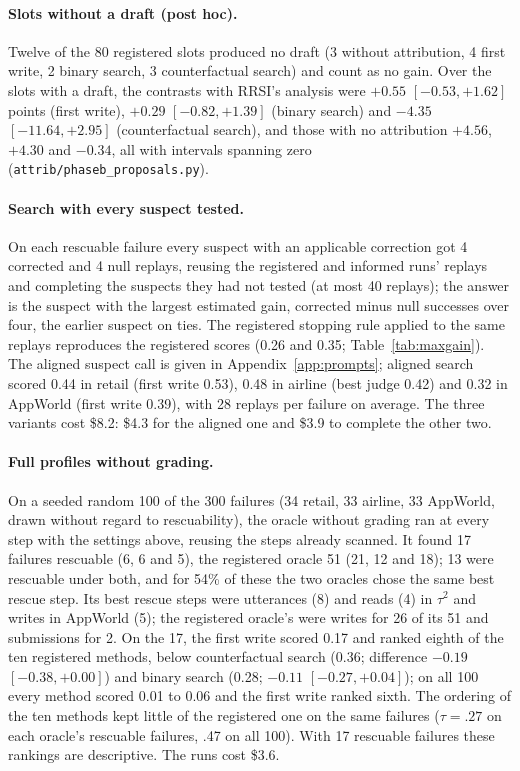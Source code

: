 \documentclass[11pt]{article}
\begin{document}
\paragraph{Slots without a draft (post hoc).} Twelve of the 80 registered slots produced no draft (3 without attribution, 4 first write, 2 binary search, 3 counterfactual search) and count as no gain. Over the slots with a draft, the contrasts with RRSI's analysis were $+0.55$ $[-0.53,+1.62]$ points (first write), $+0.29$ $[-0.82,+1.39]$ (binary search) and $-4.35$ $[-11.64,+2.95]$ (counterfactual search), and those with no attribution $+4.56$, $+4.30$ and $-0.34$, all with intervals spanning zero (\texttt{attrib/phaseb\_proposals.py}).

\paragraph{Search with every suspect tested.} On each rescuable failure every suspect with an applicable correction got 4 corrected and 4 null replays, reusing the registered and informed runs' replays and completing the suspects they had not tested (at most 40 replays); the answer is the suspect with the largest estimated gain, corrected minus null successes over four, the earlier suspect on ties. The registered stopping rule applied to the same replays reproduces the registered scores (0.26 and 0.35; Table~\ref{tab:maxgain}). The aligned suspect call is given in Appendix~\ref{app:prompts}; aligned search scored 0.44 in retail (first write 0.53), 0.48 in airline (best judge 0.42) and 0.32 in AppWorld (first write 0.39), with 28 replays per failure on average. The three variants cost \$8.2: \$4.3 for the aligned one and \$3.9 to complete the other two.

\paragraph{Full profiles without grading.} On a seeded random 100 of the 300 failures (34 retail, 33 airline, 33 AppWorld, drawn without regard to rescuability), the oracle without grading ran at every step with the settings above, reusing the steps already scanned. It found 17 failures rescuable (6, 6 and 5), the registered oracle 51 (21, 12 and 18); 13 were rescuable under both, and for 54\% of these the two oracles chose the same best rescue step. Its best rescue steps were utterances (8) and reads (4) in $\tau^2$ and writes in AppWorld (5); the registered oracle's were writes for 26 of its 51 and submissions for 2. On the 17, the first write scored 0.17 and ranked eighth of the ten registered methods, below counterfactual search (0.36; difference $-0.19$ $[-0.38,+0.00]$) and binary search (0.28; $-0.11$ $[-0.27,+0.04]$); on all 100 every method scored 0.01 to 0.06 and the first write ranked sixth. The ordering of the ten methods kept little of the registered one on the same failures ($\tau=.27$ on each oracle's rescuable failures, .47 on all 100). With 17 rescuable failures these rankings are descriptive. The runs cost \$3.6.
\end{document}
